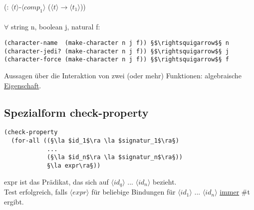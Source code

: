 \documentclass[a4paper,12pt]{article}
\newcommand{\la}{$\langle$}
\newcommand{\ra}{$\rangle$}
\begin{document}
(: $ \langle t \rangle$-$\langle comp_1 \rangle$ ($ \langle t \rangle \rightarrow \langle t_1 \rangle$))\\\\
$\forall$ string n, boolean j, natural f:
\begin{lstlisting}[style=customc]
(character-name  (make-character n j f)) §$\rightsquigarrow$§ n 
(character-jedi? (make-character n j f)) §$\rightsquigarrow$§ j 
(character-force (make-character n j f)) §$\rightsquigarrow$§ f 
\end{lstlisting}
Aussagen über die Interaktion von zwei (oder mehr) Funktionen: algebraische \uline{Eigenschaft}.\\

\subsection{Spezialform check-property}
\begin{lstlisting}[style=customc]
(check-property 
  (for-all ((§\la $id_1$\ra \la $signatur_1$\ra§)
            ...
            (§\la $id_n$\ra \la $signatur_n$\ra§))
            §\la expr\ra§))
\end{lstlisting}
		 expr ist das Prädikat,  das sich auf $\langle id_q\rangle$ ... $\langle id_n\rangle$ bezieht.
		\\
Test erfolgreich, falls $\langle expr \rangle$ für beliebige Bindungen für $\langle id_1 \rangle$ ... $\langle id_n\rangle$ \uline{immer} \#t ergibt.\\
\end{document}
